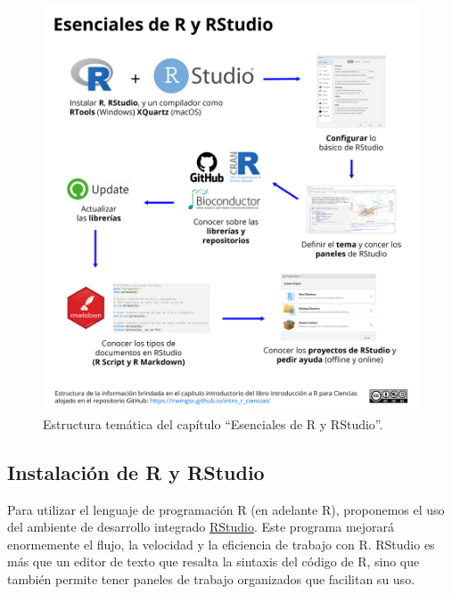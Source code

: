 \documentclass[
]{article}
\theoremstyle{definition}
\theoremstyle{definition}
\theoremstyle{definition}
\theoremstyle{definition}
\theoremstyle{remark}
\begin{document}
\begin{figure}

{\centering \includegraphics[width=1\linewidth]{figs/elaboradas/Esenciales de RStudio} 

}

\caption{Estructura temática del capítulo ``Esenciales de R y RStudio''.}\label{fig:figura1}
\end{figure}

\hypertarget{instalaciuxf3n-de-r-y-rstudio}{%
\subsection{Instalación de R y RStudio}\label{instalaciuxf3n-de-r-y-rstudio}}

Para utilizar el lenguaje de programación R (en adelante R), proponemos el uso del ambiente de desarrollo integrado \href{https://www.rstudio.com/}{RStudio}. Este programa mejorará enormemente el flujo, la velocidad y la eficiencia de trabajo con R. RStudio es más que un editor de texto que resalta la sintaxis del código de R, sino que también permite tener paneles de trabajo organizados que facilitan su uso.
\end{document}
